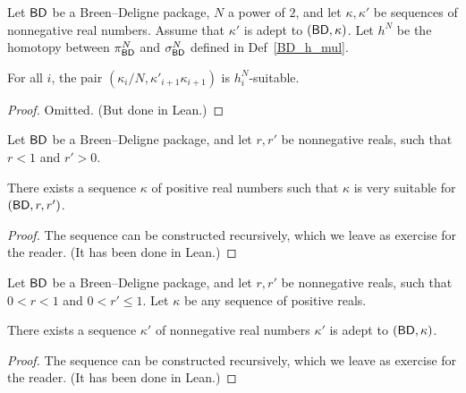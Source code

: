 \begin{lemma}
  \label{BD_h_mul_suitable}
  \leanok
  Let $\mathsf{BD}$ be a Breen--Deligne package, $N$ a power of $2$, and
  let $\kappa, \kappa'$ be sequences of nonnegative real numbers.
  Assume that $\kappa'$ is adept to $(\mathsf{BD}, \kappa)$.
  Let $h^N$ be the homotopy between $\pi^N_{\mathsf{BD}}$ and $\sigma^N_{\mathsf{BD}}$
  defined in Def~\ref{BD_h_mul}.

  For all $i$, the pair $(\kappa_i / N, \kappa'_{i+1} \kappa_{i+1})$
  is $h^N_i$-suitable.
\end{lemma}

\begin{proof}
  \leanok
  Omitted. (But done in Lean.)
\end{proof}

\begin{lemma}
  \label{exists_very_suitable}
  \leanok
  Let $\mathsf{BD}$ be a Breen--Deligne package, and
  let $r, r'$ be nonnegative reals, such that $r < 1$ and $r' > 0$.

  There exists a sequence $\kappa$ of positive real numbers
  such that $\kappa$ is very suitable for $(\mathsf{BD}, r, r')$.
\end{lemma}

\begin{proof}
  \leanok
  The sequence can be constructed recursively,
  which we leave as exercise for the reader.
  (It has been done in Lean.)
\end{proof}

\begin{lemma}
  \label{exists_adept}
  \leanok
  Let $\mathsf{BD}$ be a Breen--Deligne package, and
  let $r, r'$ be nonnegative reals, such that $0 < r < 1$ and $0 < r' \le 1$.
  Let $\kappa$ be any sequence of positive reals.

  There exists a sequence $\kappa'$ of nonnegative real numbers
  $\kappa'$ is adept to $(\mathsf{BD}, \kappa)$.
\end{lemma}

\begin{proof}
  \leanok
  The sequence can be constructed recursively,
  which we leave as exercise for the reader.
  (It has been done in Lean.)
\end{proof}


